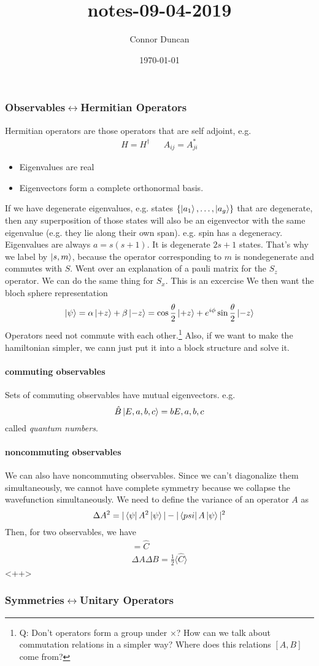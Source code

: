 \documentclass{article}
\author{Connor Duncan}
\date{\today}
\title{notes-09-04-2019}
\theoremstyle{definition}
\begin{document}
\newcommand{\adj}{^{\dag}} \subsubsection{Observables$\leftrightarrow$Hermitian Operators} Hermitian operators are those operators that are self adjoint, e.g. \begin{align} H=H\adj && A_{ij}=A_{ji}^* \end{align} \begin{itemize} \item Eigenvalues are real \item Eigenvectors form a complete orthonormal basis. \end{itemize} If we have degenerate eigenvalues, e.g. states $\{\ket{a_1},\ldots,\ket{a_g}\}$ that are degenerate, then any superposition of those states will also be an eigenvector with the same eigenvalue (e.g. they lie along their own span). e.g. spin has a degeneracy. Eigenvalues are always $a=s(s+1)$. It is degenerate $2s+1$ states. That's why we label by $\ket{s,m}$, because the operator corresponding to $m$ is nondegenerate and commutes with $S$. Went over an explanation of a pauli matrix for the $S_z$ operator. We can do the same thing for $S_x$. This is an excercise We then want the bloch sphere representation \begin{equation} \ket{\psi}=\alpha\ket{+z}+\beta\ket{-z}=\cos\frac{\theta}{2}\ket{+z}+e^{i\phi}\sin\frac{\theta}{2}\ket{-z} \end{equation} Operators need not commute with each other.\footnote{Q: Don't operators form a group under $\times$? How can we talk about commutation relations in a simpler way? Where does this relations $[A,B]$ come from?} Also, if we want to make the hamiltonian simpler, we cann just put it into a block structure and solve it. \paragraph{commuting observables} Sets of commuting observables have mutual eigenvectors. e.g. \begin{equation} \hat B\ket{E,a,b,c}=b{E,a,b,c} \end{equation} called \emph{quantum numbers}. \paragraph{noncommuting observables} We can also have noncommuting observables. Since we can't diagonalize them simultaneously, we cannot have complete symmetry because we collapse the wavefunction simultaneously. We need to define the variance of an operator $A$ as \begin{equation} \Delta A^2=|\bra{\psi}A^2\ket{\psi}|-|\bra{psi}A\ket{\psi}|^2 \end{equation} Then, for two observables, we have \begin{align} [A,B]=\hat C\\ \Delta A\Delta B=\frac{1}{2}\langle \hat C\rangle \end{align} <++> \subsubsection{Symmetries$\leftrightarrow$Unitary Operators}
\end{document}
